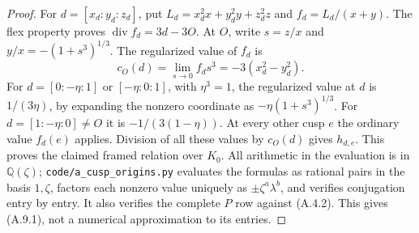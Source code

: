 \begin{proof}
For $d=[x_d:y_d:z_d]$, put
$L_d=x_d^2x+y_d^2y+z_d^2z$ and $f_d=L_d/(x+y)$.
The flex property proves $\operatorname{div}f_d=3d-3O$.
At $O$, write $s=z/x$ and
$y/x=-(1+s^3)^{1/3}$. The regularized value of $f_d$ is
\[
 c_O(d)=\lim_{s\to0}f_ds^3=-3(x_d^2-y_d^2).
\]
For $d=[0:-\eta:1]$ or $[-\eta:0:1]$, with $\eta^3=1$,
the regularized value at $d$ is $1/(3\eta)$, by expanding the
nonzero coordinate as $-\eta(1+s^3)^{1/3}$.
For $d=[1:-\eta:0]\ne O$ it is
$-1/(3(1-\eta))$. At every other cusp $e$ the ordinary value
$f_d(e)$ applies. Division of all these values by $c_O(d)$ gives
$h_{d,e}$. This proves the claimed framed relation over $K_0$.
All arithmetic in the evaluation is in $\mathbb Q(\zeta)$;
\texttt{code/a\_cusp\_origins.py} evaluates the formulas as rational
pairs in the basis $1,\zeta$, factors each nonzero value uniquely
as $\pm\zeta^a\lambda^b$, and verifies conjugation entry by entry.
It also verifies the complete $P$ row against (A.4.2).
This gives (A.9.1), not a numerical approximation to its entries.
\end{proof}


